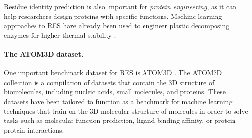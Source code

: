 Residue identity prediction is also important for \textit{protein engineering}, as it can help researchers design proteins with specific functions.
Machine learning approaches to RES have already been used to engineer plastic decomposing enzymes for higher thermal stability \cite{Lu2022}.

\paragraph{The ATOM3D dataset.} One important benchmark dataset for RES is ATOM3D \cite{atom-3d}.
The ATOM3D collection is a compilation of datasets that contain the 3D structure of biomolecules, including nucleic acids, small molecules, and proteins. 
These datasets have been tailored to function as a benchmark for machine learning techniques that train on the 3D molecular structure of molecules in order to solve tasks such as molecular function prediction, ligand binding affinity, or protein-protein interactions.

